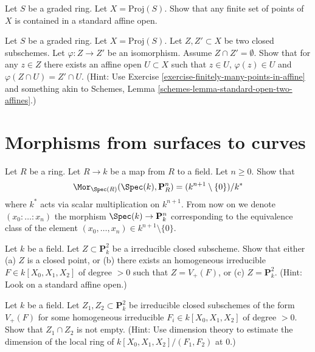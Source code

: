 \begin{exercise}
\label{exercise-finitely-many-points-in-affine}
Let $S$ be a graded ring.
Let $X = \text{Proj}(S)$.
Show that any finite set of points of $X$ is contained in a standard
affine open.
\end{exercise}

\begin{exercise}
\label{exercise-prepare-glueing}
Let $S$ be a graded ring.
Let $X = \text{Proj}(S)$.
Let $Z, Z' \subset X$ be two closed subschemes.
Let $\varphi : Z \to Z'$ be an isomorphism.
Assume $Z \cap Z' = \emptyset$.
Show that for any $z \in Z$ there exists an affine
open $U \subset X$ such that $z \in U$, $\varphi(z) \in U$ and
$\varphi(Z \cap U) = Z' \cap U$.
(Hint: Use Exercise \ref{exercise-finitely-many-points-in-affine}
and something akin to
Schemes, Lemma \ref{schemes-lemma-standard-open-two-affines}.)
\end{exercise}










\section{Morphisms from surfaces to curves}
\label{section-from-surfaces-to-curves}

\begin{exercise}
\label{exercise-points-projective-space}
Let $R$ be a ring.
Let $R \to k$ be a map from $R$ to a field.
Let $n \geq 0$.
Show that
$$
\Mor_{\Spec(R)}(\Spec(k), \mathbf{P}^n_R)
=
(k^{n + 1} \setminus \{0\})/k^*
$$
where $k^*$ acts via scalar multiplication on $k^{n + 1}$.
From now on we denote $(x_0 : \ldots : x_n)$ the
morphism $\Spec(k) \to \mathbf{P}^n_k$ corresponding
to the equivalence class of the element
$(x_0, \ldots, x_n) \in k^{n + 1} \setminus \{0\}$.
\end{exercise}

\begin{exercise}
\label{exercise-curve-projective-plane}
Let $k$ be a field. Let $Z \subset \mathbf{P}^2_k$ be a
irreducible closed subscheme.
Show that either (a) $Z$ is a closed point, or (b) there exists
an homogeneous irreducible $F \in k[X_0, X_1, X_2]$ of degree $> 0$
such that $Z = V_{+}(F)$, or (c) $Z = \mathbf{P}^2_k$.
(Hint: Look on a standard affine open.)
\end{exercise}

\begin{exercise}
\label{exercise-bezout}
Let $k$ be a field. Let $Z_1, Z_2 \subset \mathbf{P}^2_k$ be
irreducible closed subschemes of the form $V_{+}(F)$
for some homogeneous irreducible $F_i \in k[X_0, X_1, X_2]$ of degree $> 0$.
Show that $Z_1 \cap Z_2$ is not empty.
(Hint: Use dimension theory to estimate the dimension of
the local ring of $k[X_0, X_1, X_2]/(F_1, F_2)$ at $0$.)
\end{exercise}

